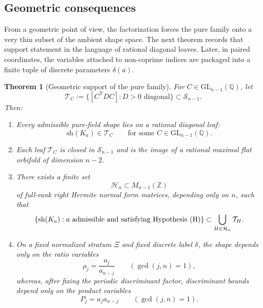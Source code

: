 \documentclass[11pt,letterpaper]{amsart}
\newcommand{\Q}{\mathbb{Q}}
\newcommand{\Z}{\mathbb{Z}}
\newcommand{\GL}{\mathrm{GL}}
\newcommand{\sh}{\mathrm{sh}}
\theoremstyle{plain}
\newtheorem{theorem}{Theorem}[section]
\theoremstyle{definition}
\begin{document}
\subsection{Geometric consequences}

From a geometric point of view, the factorization forces the pure family onto a very thin subset of the ambient shape space. The next theorem records that support statement in the language of rational diagonal leaves.  Later, in paired coordinates, the variables attached to non-coprime indices are
packaged into a finite tuple of discrete parameters \(\delta(a)\).

\begin{theorem}[Geometric support of the pure family]
\label{thm:intro-geometry}
For \(C\in \GL_{n-1}(\Q)\), let
\[
\mathcal T_C
:=
\{[C^{\mathsf T}DC]: D>0\text{ diagonal}\}\subset \mathscr S_{n-1}.
\]
Then:
\begin{enumerate}[label=\textup{(\roman*)},leftmargin=2.8em]
\item
Every admissible pure-field shape lies on a rational diagonal leaf:
\[
\sh(K_a)\in \mathcal T_C
\qquad\text{for some }C\in \GL_{n-1}(\Q).
\]

\item
Each leaf \(\mathcal T_C\) is closed in \(\mathscr S_{n-1}\) and is the image
of a rational maximal flat orbifold of dimension \(n-2\).

\item
There exists a finite set
\[
\mathcal H_n\subset M_{n-1}(\Z)
\]
of full-rank right Hermite normal form matrices, depending only on \(n\), such
that
\[
\{\sh(K_a): a \text{ admissible and satisfying Hypothesis~\textup{(H)}}\}
\subset
\bigcup_{H\in \mathcal H_n}\mathcal T_H.
\]

\item
On a fixed normalized stratum \(\Xi\) and fixed discrete label \(\delta\), the
shape depends only on the ratio variables
\[
\rho_j=\frac{a_j}{a_{n-j}}
\qquad (\gcd(j,n)=1),
\]
whereas, after fixing the periodic discriminant factor, discriminant bounds
depend only on the product variables
\[
P_j=a_j a_{n-j}
\qquad (\gcd(j,n)=1).
\]
\end{enumerate}
\end{theorem}
\end{document}
